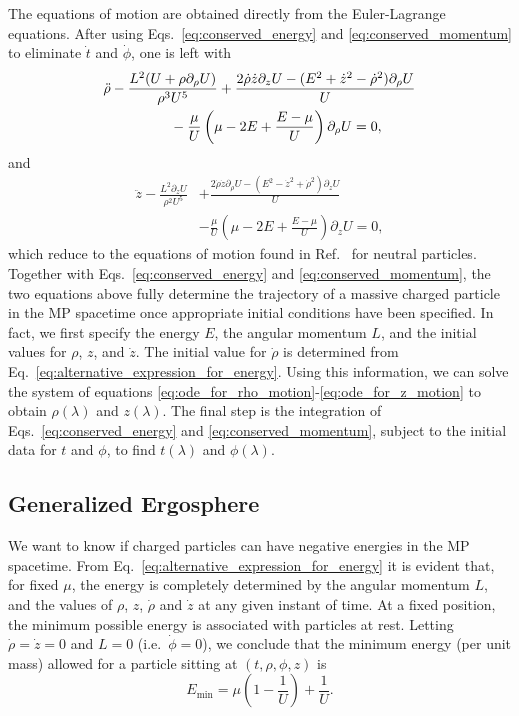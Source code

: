 The equations of motion are obtained directly from the Euler-Lagrange equations. After using Eqs.~\eqref{eq:conserved_energy} and \eqref{eq:conserved_momentum} to eliminate $\dot{t}$ and $\dot{\phi}$, one is left with
%
\begin{align}
  \ddot{\rho} & -\frac{L^2(U +\rho \partial_{\rho}U)}{\rho^3 U^5} + \frac{2\dot{\rho}\dot{z}\partial_{z}U - (E^2 + \dot{z}^2 - \dot{\rho}^2)\partial_{\rho}U}{U} \nonumber \\ & \hspace{1.5cm} - \frac{\mu}{U}\left(\mu-2 E+\frac{E-\mu}{U}\right)\partial_{\rho}U = 0,
  \label{eq:ode_for_rho_motion}
\end{align}
%
and
\begin{align}
  \ddot{z} - \frac{L^2\partial_{z}U}{\rho^2 U^5} & + \frac{2\dot{\rho}\dot{z}\partial_{\rho}U - (E^2 - \dot{z}^2 + \dot{\rho}^2)\partial_{z}U}{U} \nonumber \\ &-  \frac{\mu}{U}\left(\mu-2 E+\frac{ E-\mu}{U}\right)\partial_{z}U = 0,
  \label{eq:ode_for_z_motion}
\end{align}
which reduce to the equations of motion found in Ref.~\cite{ASSUMPCAO2018} for neutral particles. Together with Eqs.~\eqref{eq:conserved_energy} and \eqref{eq:conserved_momentum}, the two equations above fully determine the trajectory of a massive charged particle in the MP spacetime once appropriate initial conditions have been specified. In fact, we first specify the energy $E$, the angular momentum $L$, and the initial values for $\rho$, $z$, and $\dot z$. The initial value for $\dot{\rho}$ is determined from Eq.~\eqref{eq:alternative_expression_for_energy}. Using this information, we can solve the system of equations \eqref{eq:ode_for_rho_motion}-\eqref{eq:ode_for_z_motion} to obtain $\rho(\lambda)$ and $z(\lambda)$. The final step is the integration of Eqs.~\eqref{eq:conserved_energy} and \eqref{eq:conserved_momentum}, subject to the initial data for $t$ and $\phi$, to find $t(\lambda)$ and $\phi(\lambda)$.

\subsection{Generalized Ergosphere} \label{Sec:gen_ergo}

We want to know if charged particles can have negative energies in the MP spacetime. From Eq.~\eqref{eq:alternative_expression_for_energy} it is evident that, for fixed $\mu$, the energy is completely determined by the angular momentum $L$, and the values of $\rho$, $z$, $\dot{\rho}$ and $\dot{z}$  at any given instant of time. At a fixed position, the minimum possible energy is associated with particles at rest. Letting $\dot{\rho}=\dot{z}=0$ and $L=0$ (i.e.~$\dot{\phi}=0$), we conclude that the minimum energy (per unit mass) allowed for a particle sitting at $(t,\rho,\phi,z)$ is
\begin{equation} \label{eq:minimum_energy}
  E_{\mathrm{min}} = \mu\left(1-\frac{1}{U}\right) + \frac{1}{U}.
\end{equation}

